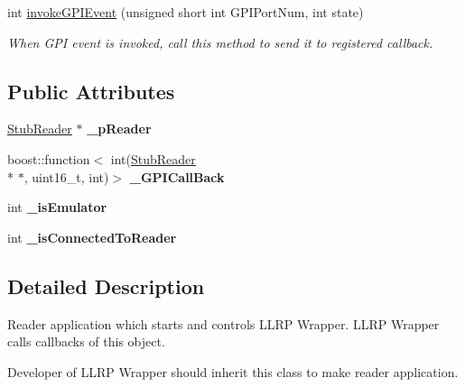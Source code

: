\begin{DoxyCompactItemize}
int \hyperlink{class_e_l_f_i_n_1_1_stub_reader_app_a4ad90b511e2fa84cc69319ec302a6d4a}{invoke\-G\-P\-I\-Event} (unsigned short int G\-P\-I\-Port\-Num, int state)
\begin{DoxyCompactList}\small\item\em When G\-P\-I event is invoked, call this method to send it to registered callback. \end{DoxyCompactList}\end{DoxyCompactItemize}
\subsection*{Public Attributes}
\begin{DoxyCompactItemize}
\item 
\hypertarget{class_e_l_f_i_n_1_1_stub_reader_app_a65b12bc97c5c428576cb9465f2e1d344}{\hyperlink{class_e_l_f_i_n_1_1_stub_reader}{Stub\-Reader} $\ast$ {\bfseries \-\_\-p\-Reader}}\label{class_e_l_f_i_n_1_1_stub_reader_app_a65b12bc97c5c428576cb9465f2e1d344}

\item 
\hypertarget{class_e_l_f_i_n_1_1_stub_reader_app_a660d9e1214b10b13ae02bcd7189d4008}{boost\-::function$<$ int(\hyperlink{class_e_l_f_i_n_1_1_stub_reader}{Stub\-Reader} \\*
$\ast$, uint16\-\_\-t, int)$>$ {\bfseries \-\_\-\-G\-P\-I\-Call\-Back}}\label{class_e_l_f_i_n_1_1_stub_reader_app_a660d9e1214b10b13ae02bcd7189d4008}

\item 
\hypertarget{class_e_l_f_i_n_1_1_stub_reader_app_ad32bf4c300cda075cced5e3649f26b5b}{int {\bfseries \-\_\-is\-Emulator}}\label{class_e_l_f_i_n_1_1_stub_reader_app_ad32bf4c300cda075cced5e3649f26b5b}

\item 
\hypertarget{class_e_l_f_i_n_1_1_stub_reader_app_a56cb9681a9849663216e05412aa7617f}{int {\bfseries \-\_\-is\-Connected\-To\-Reader}}\label{class_e_l_f_i_n_1_1_stub_reader_app_a56cb9681a9849663216e05412aa7617f}

\end{DoxyCompactItemize}


\subsection{Detailed Description}
Reader application which starts and controls L\-L\-R\-P Wrapper. L\-L\-R\-P Wrapper calls callbacks of this object.\par
Developer of L\-L\-R\-P Wrapper should inherit this class to make reader application. 

